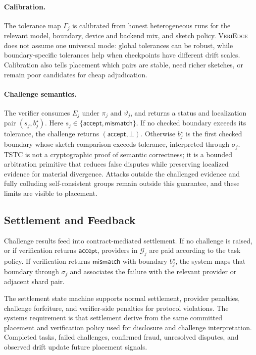 \documentclass[sigplan,screen,review,anonymous]{acmart}
\newcommand{\system}{\textsc{VeriEdge}\xspace}
\begin{document}
\paragraph{Calibration.}
The tolerance map \(\Gamma_j\) is calibrated from honest heterogeneous runs
for the relevant model, boundary, device and backend mix, and sketch policy.
\system does not assume one universal mode: global tolerances can be robust,
while boundary-specific tolerances help when checkpoints have different drift
scales. Calibration also tells placement which pairs are stable, need richer
sketches, or remain poor candidates for cheap adjudication.

\paragraph{Challenge semantics.}
\label{subsec:semantics}
The verifier consumes \(E_j\) under \(\pi_j\) and \(\vartheta_j\), and
returns a status and localization pair \((s_j,b^\star_j)\). Here
\(s_j\in\{\mathsf{accept},\mathsf{mismatch}\}\). If no checked boundary
exceeds its tolerance, the challenge returns
\((\mathsf{accept},\bot)\). Otherwise \(b^\star_j\) is the first checked
boundary whose sketch comparison exceeds tolerance, interpreted through
\(\sigma_j\). TSTC is not a cryptographic proof of semantic correctness; it is
a bounded arbitration primitive that reduces false disputes while preserving
localized evidence for material divergence. Attacks outside the challenged
evidence and fully colluding self-consistent groups remain outside this
guarantee, and these limits are visible to placement.

\subsection{Settlement and Feedback}
\label{subsec:settlement-feedback}

Challenge results feed into contract-mediated settlement. If no challenge is
raised, or if verification returns \(\mathsf{accept}\), providers in
\(\mathcal{G}_j\) are paid according to the task policy. If verification
returns \(\mathsf{mismatch}\) with boundary \(b^\star_j\), the system maps
that boundary through \(\sigma_j\) and associates the failure with the relevant
provider or adjacent shard pair.

The settlement state machine supports normal settlement, provider penalties,
challenge forfeiture, and verifier-side penalties for protocol violations. The
systems requirement is that settlement derive from the same committed placement
and verification policy used for disclosure and challenge interpretation.
Completed tasks, failed challenges, confirmed fraud, unresolved disputes, and
observed drift update future placement signals.
\end{document}
